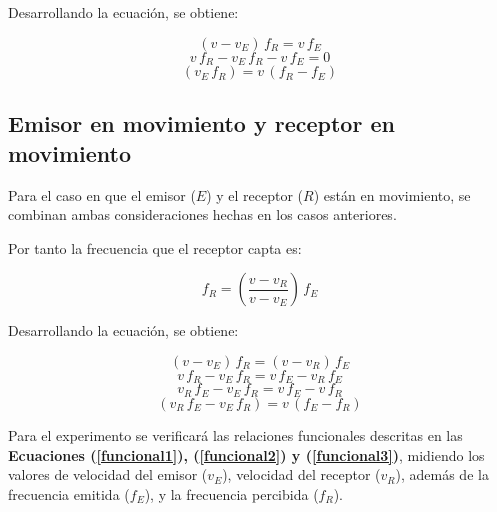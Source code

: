 \documentclass[letter,11pt]{article}
\begin{document}
Desarrollando la ecuación, se obtiene:

\begin{equation*}
    (v - v_E)\,f_R = v\,f_E
\end{equation*}
\begin{equation*}
    v\,f_R - v_E\,f_R - v\,f_E = 0
\end{equation*}
\begin{equation}
    (v_E\,f_R) = v\,(f_R - f_E) 
\label{funcional2}
\end{equation}
\vspace{0.10cm}

\subsection{Emisor en movimiento y receptor en movimiento}

Para el caso en que el emisor ($E$) y el receptor ($R$) están en movimiento, se
combinan ambas consideraciones hechas en los casos anteriores.

Por tanto la frecuencia que el receptor capta es:

\begin{equation}
    f_R = \left(\frac{v - v_R}{v - v_E}\right)\, f_E
\label{doppler}
\end{equation}
\vspace{0.10cm}

Desarrollando la ecuación, se obtiene:

\begin{equation*}
    (v - v_E)\,f_R = (v - v_R)\,f_E
\end{equation*}
\begin{equation*}
    v\,f_R - v_E\,f_R = v\,f_E - v_R\,f_E
\end{equation*}
\begin{equation*}
    v_R\,f_E - v_E\,f_R = v\,f_E - v\,f_R 
\end{equation*}
\begin{equation}
    (v_R\,f_E-v_E\,f_R) = v\,(f_E - f_R)
\label{funcional3}
\end{equation}
\vspace{0.10cm}

Para el experimento se verificará las relaciones funcionales descritas en las
\textbf{Ecuaciones (\ref{funcional1}), (\ref{funcional2}) y (\ref{funcional3})},
midiendo los valores de velocidad del emisor ($v_E$), velocidad del receptor
($v_R$), además de la frecuencia emitida ($f_E$), y la frecuencia percibida
($f_R$).
\end{document}
